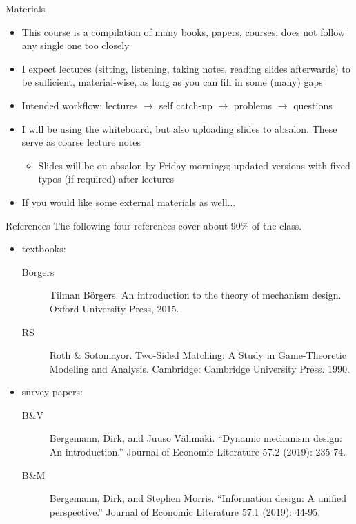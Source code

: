 \documentclass[english,10pt
,aspectratio=169
]{beamer}
\begin{document}
\begin{frame}{Materials}
	\begin{itemize}
		\item This course is a compilation of many books, papers, courses; does not follow any single one too closely
		\item I expect lectures (sitting, listening, taking notes, reading slides afterwards) to be sufficient, material-wise, as long as you can fill in some (many) gaps
		\item Intended workflow: lectures $\to$ self catch-up $\to$ problems $\to$ questions
		\item I will be using the whiteboard, but also uploading slides to absalon. These serve as coarse lecture notes
		\begin{itemize}
			\item Slides will be on absalon by Friday mornings; updated versions with fixed typos (if required) after lectures
		\end{itemize}
		\item If you would like some external materials as well...
	\end{itemize}
\end{frame}


\begin{frame}{References}
	The following four references cover about 90\% of the class.
	\begin{itemize}
		\item textbooks:
		\begin{description}
			\item[B\"{o}rgers] Tilman B\"{o}rgers. An introduction to the theory of mechanism design. Oxford University Press, 2015.
			\item[RS] Roth \& Sotomayor. Two-Sided Matching: A Study in Game-Theoretic Modeling and Analysis. Cambridge: Cambridge University Press. 1990.
		\end{description}
		\item survey papers:
		\begin{description}
			\item[B\&V] Bergemann, Dirk, and Juuso Välimäki. ``Dynamic mechanism design: An introduction.'' Journal of Economic Literature 57.2 (2019): 235-74.
			\item[B\&M] Bergemann, Dirk, and Stephen Morris. ``Information design: A unified perspective.'' Journal of Economic Literature 57.1 (2019): 44-95. 
		\end{description}
	\end{itemize}
\end{frame}
\end{document}
